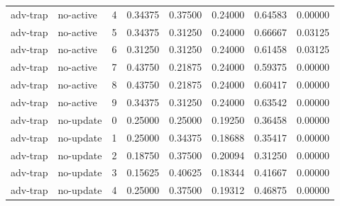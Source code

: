 \documentclass{article}
\begin{document}
\begin{center}
\begin{longtable}{llllllll}
adv-trap & no-active & 4 & 0.34375 & 0.37500 & 0.24000 & 0.64583 & 0.00000 \\
adv-trap & no-active & 5 & 0.34375 & 0.31250 & 0.24000 & 0.66667 & 0.03125 \\
adv-trap & no-active & 6 & 0.31250 & 0.31250 & 0.24000 & 0.61458 & 0.03125 \\
adv-trap & no-active & 7 & 0.43750 & 0.21875 & 0.24000 & 0.59375 & 0.00000 \\
adv-trap & no-active & 8 & 0.43750 & 0.21875 & 0.24000 & 0.60417 & 0.00000 \\
adv-trap & no-active & 9 & 0.34375 & 0.31250 & 0.24000 & 0.63542 & 0.00000 \\
adv-trap & no-update & 0 & 0.25000 & 0.25000 & 0.19250 & 0.36458 & 0.00000 \\
adv-trap & no-update & 1 & 0.25000 & 0.34375 & 0.18688 & 0.35417 & 0.00000 \\
adv-trap & no-update & 2 & 0.18750 & 0.37500 & 0.20094 & 0.31250 & 0.00000 \\
adv-trap & no-update & 3 & 0.15625 & 0.40625 & 0.18344 & 0.41667 & 0.00000 \\
adv-trap & no-update & 4 & 0.25000 & 0.37500 & 0.19312 & 0.46875 & 0.00000 \\
\bottomrule
\end{longtable}
\renewcommand{\arraystretch}{1.0}
\end{center}
\end{document}
